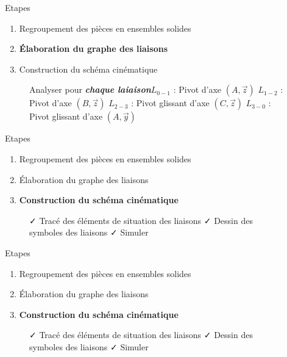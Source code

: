 \documentclass[
  ignorenonframetext,
  aspectratio=169,
  c]{beamer}
\providecommand{\tightlist}{%
  \setlength{\itemsep}{0pt}\setlength{\parskip}{0pt}}\usepackage{longtable,booktabs,array}
\begin{document}
\begin{frame}{Etapes}
\label{etapes-4}
\begin{enumerate}
\tightlist
\item
  {Regroupement des pièces en ensembles solides}
\item
  \textbf{Élaboration du graphe des liaisons}
\item
  {Construction du schéma cinématique}
\end{enumerate}

\begin{figure}

\begin{minipage}{0.80\linewidth}
Analyser pour \textbf{\emph{chaque laiaison}}\(L_{0-1}\) : Pivot d'axe
\((𝐴,\vec{z})\) \(L_{1-2}\) : Pivot d'axe \((𝐵,\vec{z})\) \(L_{2-3}\) :
Pivot glissant d'axe \((𝐶,\vec{z})\) \(L_{3-0}\) : Pivot glissant d'axe
\((𝐴,\vec{y})\)\end{minipage}%

\end{figure}%
\end{frame}

\begin{frame}{Etapes}
\label{etapes-5}
\begin{enumerate}
\tightlist
\item
  {Regroupement des pièces en ensembles solides}
\item
  {Élaboration du graphe des liaisons}
\item
  \textbf{Construction du schéma cinématique}
\end{enumerate}

\begin{figure}

\begin{minipage}{0.80\linewidth}
✓ Tracé des éléments de situation des liaisons {✓ Dessin des symboles
des liaisons} {✓ Simuler}\end{minipage}%

\end{figure}%
\end{frame}

\begin{frame}{Etapes}
\label{etapes-6}
\begin{enumerate}
\tightlist
\item
  {Regroupement des pièces en ensembles solides}
\item
  {Élaboration du graphe des liaisons}
\item
  \textbf{Construction du schéma cinématique}
\end{enumerate}

\begin{figure}

\begin{minipage}{0.80\linewidth}
{✓ Tracé des éléments de situation des liaisons} ✓ Dessin des symboles
des liaisons {✓ Simuler}\end{minipage}%

\end{figure}%
\end{frame}
\end{document}
